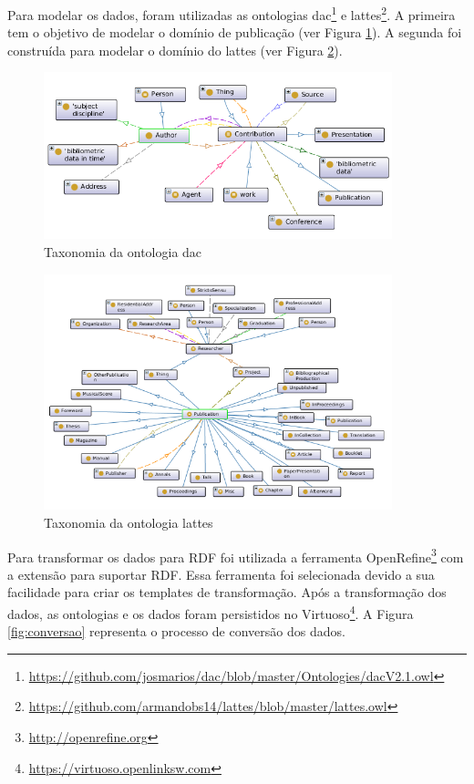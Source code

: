 Para modelar os dados, foram utilizadas as ontologias dac\footnote{\url{https://github.com/josmarios/dac/blob/master/Ontologies/dacV2.1.owl}} e lattes\footnote{\url{https://github.com/armandobs14/lattes/blob/master/lattes.owl}}. A primeira tem o objetivo de modelar o domínio de publicação (ver Figura \ref{fig:dac}). A segunda foi construída para modelar o domínio do lattes (ver Figura \ref{fig:lattes}).

\begin{figure}[!ht]
	\centering
	\includegraphics[width=0.9\textwidth]{./imagens/dac-mainview.png}
	\caption{Taxonomia da ontologia dac}
	\label{fig:dac}
\end{figure}

\begin{figure}[!ht]
	\centering
	\includegraphics[width=0.9\textwidth]{./imagens/lattes-mainview.png}
	\caption{Taxonomia da ontologia lattes}
	\label{fig:lattes}
\end{figure}

Para transformar os dados para RDF foi utilizada a ferramenta OpenRefine\footnote{\url{http://openrefine.org}} com a extensão para suportar RDF. Essa ferramenta foi selecionada devido a sua facilidade para criar os templates de transformação. Após a transformação dos dados, as ontologias e os dados foram persistidos no Virtuoso\footnote{\url{https://virtuoso.openlinksw.com}}. A Figura \ref{fig:conversao} representa o processo de conversão dos dados.

